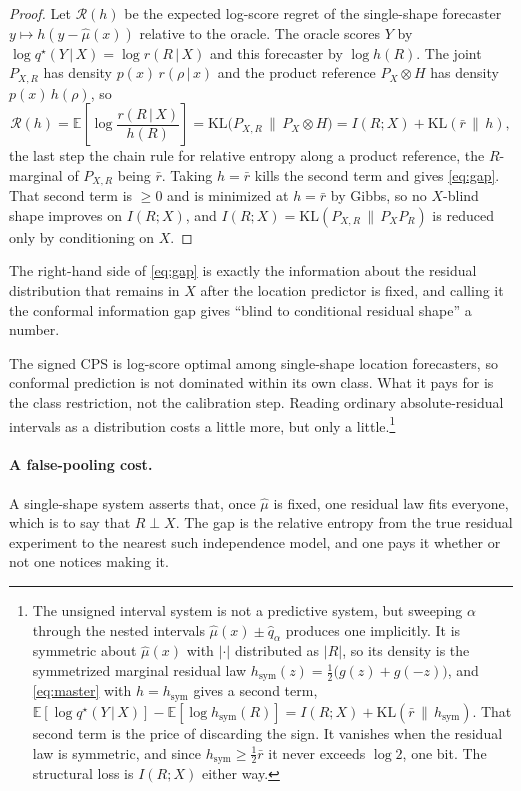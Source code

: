 \documentclass[11pt]{article}
\theoremstyle{definition}
\newcommand{\E}{\mathbb{E}}
\newcommand{\KL}{\mathrm{KL}}
\newcommand{\given}{\,\vert\,}
\begin{document}
\begin{proof}
Let $\mathcal{R}(h)$ be the expected log-score regret of the single-shape forecaster
$y\mapsto h(y-\hat\mu(x))$ relative to the oracle. The oracle scores $Y$ by
$\log q^\star(Y\given X)=\log r(R\given X)$ and this forecaster by $\log h(R)$. The joint
$P_{X,R}$ has density $p(x)\,r(\rho\given x)$ and the product reference $P_X\otimes H$ has
density $p(x)\,h(\rho)$, so
\begin{equation}\label{eq:master}
  \mathcal{R}(h)=\E\!\left[\log\frac{r(R\given X)}{h(R)}\right]
      =\KL\!\big(P_{X,R}\,\big\|\,P_X\otimes H\big)
      = I(R;X)+\KL(\bar r\,\|\,h),
\end{equation}
the last step the chain rule for relative entropy along a product reference, the $R$-marginal
of $P_{X,R}$ being $\bar r$. Taking $h=\bar r$ kills the second term and gives
\eqref{eq:gap}. That second term is $\ge 0$ and is minimized at $h=\bar r$ by Gibbs, so no
$X$-blind shape improves on $I(R;X)$, and $I(R;X)=\KL(P_{X,R}\,\|\,P_X P_R)$ is reduced only
by conditioning on $X$.
\end{proof}

The right-hand side of
\eqref{eq:gap} is exactly the information about the residual distribution that remains in
$X$ after the location predictor is fixed, and calling it the conformal information gap
gives ``blind to conditional residual shape'' a number. 

The signed CPS is log-score optimal among single-shape location forecasters, so conformal
prediction is not dominated within its own class. What it pays for is the class restriction,
not the calibration step. Reading ordinary absolute-residual intervals as a distribution
costs a little more, but only a little.\footnote{The unsigned interval system is not a
predictive system, but sweeping $\alpha$ through the nested intervals
$\hat\mu(x)\pm\hat q_\alpha$ produces one implicitly. It is symmetric about $\hat\mu(x)$
with $|{\cdot}|$ distributed as $|R|$, so its density is the symmetrized marginal residual
law $h_{\mathrm{sym}}(z)=\tfrac12\big(g(z)+g(-z)\big)$, and \eqref{eq:master} with
$h=h_{\mathrm{sym}}$ gives a second term,
$\E[\log q^\star(Y\given X)]-\E[\log h_{\mathrm{sym}}(R)]=I(R;X)+\KL(\bar r\,\|\,
h_{\mathrm{sym}})$. That second term is the price of discarding the sign. It vanishes when
the residual law is symmetric, and since $h_{\mathrm{sym}}\ge\tfrac12\bar r$ it never
exceeds $\log 2$, one bit. The structural loss is $I(R;X)$ either way.}

\paragraph{A false-pooling cost.} A single-shape system asserts that, once $\hat\mu$ is
fixed, one residual law fits everyone, which is to say that $R\perp X$. The gap is the
relative entropy from the true residual experiment to the nearest such independence model,
and one pays it whether or not one notices making it.
\end{document}
